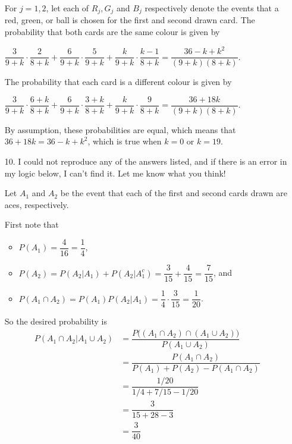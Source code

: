 \documentclass[11pt,fleqn,dvipsnames,usenames]{article}
\begin{document}
\begin{enumerate}
For $j=1,2$, let each of $R_{j}, G_{j}$ and $B_{j}$ respectively denote the events that a red, green, or ball is chosen for the first and second drawn card.  The probability that both cards are the same colour is given by
\begin{center}
$\dfrac{3}{9+k}\cdot\dfrac{2}{8 + k} + \dfrac{6}{9+k}\cdot\dfrac{5}{9+k} + \dfrac{k}{9+k}\cdot\dfrac{k-1}{8+k} = \dfrac{36 - k + k^2}{(9+k)(8+k)}$.
\end{center}
%
The probability that each card is a different colour is given by
\begin{center}
$\dfrac{3}{9+k}\cdot \dfrac{6+k}{8+k} + \dfrac{6}{9+k}\cdot \dfrac{3+k}{8+k} + \dfrac{k}{9+k}\cdot \dfrac{9}{8+k} = \dfrac{36 + 18k}{(9+k)(8+k)}$.
\end{center}
By assumption, these probabilities are equal, which means that $36 + 18k = 36 - k + k^2$, which is true when $k = 0$ or $k=19$.

\item[10.] \note I could not reproduce any of the answers listed, and if there is an error in my logic below, I can't find it.  Let me know what you think!

Let $A_{1}$ and $A_{2}$ be the event that each of the first and second cards drawn are aces, respectively.

First note that
\begin{itemize}
\item $P(A_{1}) = \dfrac{4}{16} = \dfrac{1}{4}$,
\item $P(A_{2}) = P(A_{2}|A_{1}) + P(A_{2}|A_{1}^{c}) = \dfrac{3}{15} + \dfrac{4}{15} = \dfrac{7}{15}$, and
\item $P(A_{1}\cap A_{2}) = P(A_{1})P(A_{2}|A_{1}) = \dfrac{1}{4}\cdot \dfrac{3}{15} = \dfrac{1}{20}$.
\end{itemize}
So the desired probability is
\begin{align*}
P(A_{1}\cap A_{2}|A_{1}\cup A_{2}) &= \dfrac{P\big((A_{1}\cap A_{2})\cap (A_{1}\cup A_{2})\big)}{P(A_{1}\cup A_{2})}\\
&= \dfrac{P(A_{1}\cap A_{2})}{P(A_{1}) + P(A_{2}) - P(A_{1}\cap A_{2})}\\
&= \dfrac{1/20}{1/4 + 7/15 - 1/20}\\
&= \dfrac{3}{15 + 28 - 3}\\
&= \dfrac{3}{40}
\end{align*}
\end{enumerate}
\end{document}
